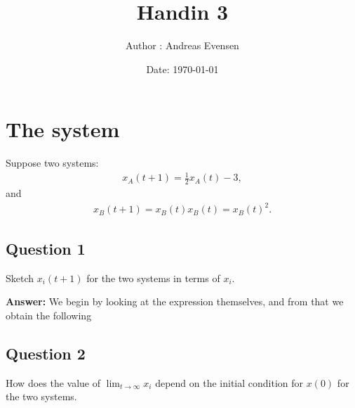 \documentclass[a4paper]{article}
\title{Handin 3}
\author{Author : Andreas Evensen}
\date{Date: \today}
\newcommand{\newparagraph}{\vspace{.5cm}\noindent}
\begin{document}
\maketitle
\section*{The system}
Suppose two systems:
{\color{blue}
\begin{align*}
    x_A(t + 1) = \frac{1}{2}x_A(t) - 3,
\end{align*}
}and {\color{red}
\begin{align*}
    x_B(t+1) = x_B(t)x_B(t) = x_B(t)^2.
\end{align*}
}

\subsection*{Question 1}
Sketch $x_i(t + 1)$ for the two systems in terms of $x_i$.

\newparagraph
\textbf{Answer: }We begin by looking at the expression themselves, and from that we obtain the following
\begin{figure}[H]
    \centering
\end{figure}
\subsection*{Question 2}
How does the value of $\lim_{t\to\infty}x_i$ depend on the initial condition for $x(0)$ for the two systems.
\end{document}
